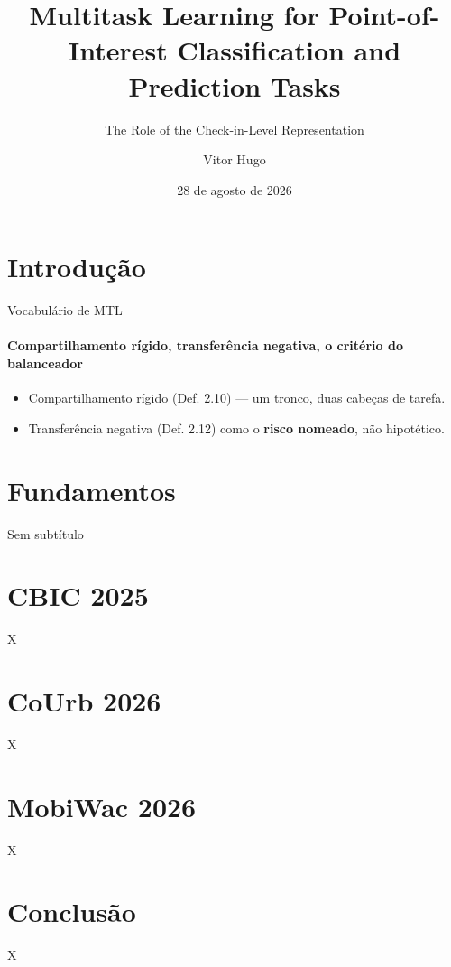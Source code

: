 \documentclass{beamer}
\title{Multitask Learning for Point-of-Interest Classification and Prediction Tasks}
\subtitle{The Role of the Check-in-Level Representation}
\author{Vitor Hugo}
\institute{Universidade Federal de Viçosa --- PPGCC}
\date{28 de agosto de 2026}
\begin{document}
\section{Introdução}
\begin{frame}{Vocabulário de MTL}
\framesubtitle{Compartilhamento rígido, transferência negativa, o critério do balanceador}
\begin{itemize}
    \item Compartilhamento rígido (Def. 2.10) --- um tronco, duas cabeças de tarefa.
    \item Transferência negativa (Def. 2.12) como o \textbf{risco nomeado}, não hipotético.
\end{itemize}
\end{frame}
\section{Fundamentos}\begin{frame}{Sem subtítulo}\end{frame}
\section{CBIC 2025}\begin{frame}{X}\end{frame}
\section{CoUrb 2026}\begin{frame}{X}\end{frame}
\section{MobiWac 2026}\begin{frame}{X}\end{frame}
\section{Conclusão}\begin{frame}{X}\end{frame}
\end{document}
